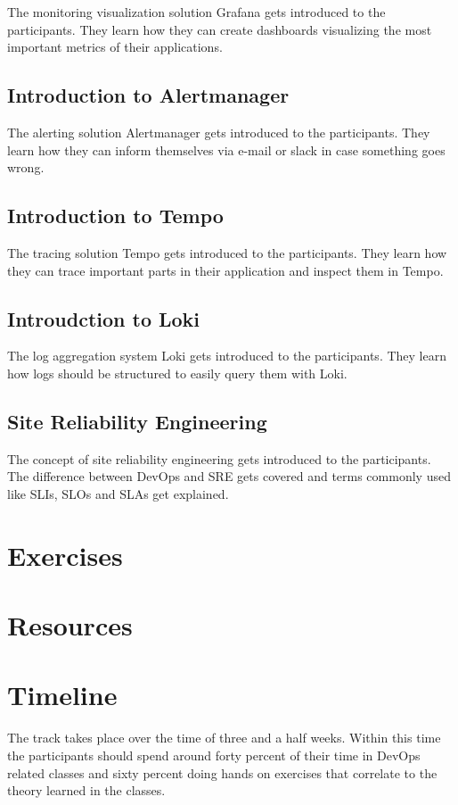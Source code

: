 \documentclass{article}
\begin{document}
The monitoring visualization solution Grafana gets introduced to the
participants. They learn how they can create dashboards visualizing the most
important metrics of their applications.

\subsection{Introduction to Alertmanager}

The alerting solution Alertmanager gets introduced to the participants. They
learn how they can inform themselves via e-mail or slack in case something goes
wrong.

\subsection{Introduction to Tempo}

The tracing solution Tempo gets introduced to the participants. They learn how
they can trace important parts in their application and inspect them in Tempo.

\subsection{Introudction to Loki}

The log aggregation system Loki gets introduced to the participants. They learn
how logs should be structured to easily query them with Loki.

\subsection{Site Reliability Engineering}

The concept of site reliability engineering gets introduced to the participants.
The difference between DevOps and SRE gets covered and terms commonly used like
SLIs, SLOs and SLAs get explained.

\newpage

\section{Exercises}

\newpage

\section{Resources}

\newpage

\section{Timeline}

The track takes place over the time of three and a half weeks. Within this time
the participants should spend around forty percent of their time in DevOps
related classes and sixty percent doing hands on exercises that correlate to the
theory learned in the classes.
\end{document}
